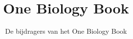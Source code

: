 \documentclass[11pt,a4paper,twoside,openany]{book}
\title{One Biology Book}
\author{De bijdragers van het One Biology Book}
\date{\bookdate}
\begin{document}
\frontmatter




\tableofcontents

\mainmatter





\appendix
\part{\omsolutionspart}




\backmatter
\renewcommand{\indexspace}{\par\vskip 8pt plus 4pt minus 4pt\relax}
\printindex
\end{document}
